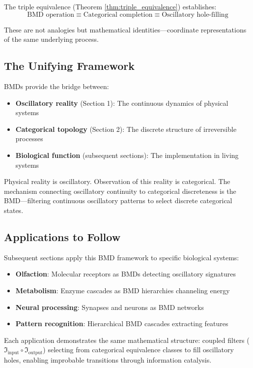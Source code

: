 \documentclass[12pt,a4paper]{article}
\begin{document}
The triple equivalence (Theorem \ref{thm:triple_equivalence}) establishes:
\begin{equation}
\text{BMD operation} \equiv \text{Categorical completion} \equiv \text{Oscillatory hole-filling}
\end{equation}

These are not analogies but mathematical identities—coordinate representations of the same underlying process.

\subsection{The Unifying Framework}

BMDs provide the bridge between:
\begin{itemize}
\item \textbf{Oscillatory reality} (Section 1): The continuous dynamics of physical systems
\item \textbf{Categorical topology} (Section 2): The discrete structure of irreversible processes
\item \textbf{Biological function} (subsequent sections): The implementation in living systems
\end{itemize}

Physical reality is oscillatory. Observation of this reality is categorical. The mechanism connecting oscillatory continuity to categorical discreteness is the BMD—filtering continuous oscillatory patterns to select discrete categorical states.

\subsection{Applications to Follow}

Subsequent sections apply this BMD framework to specific biological systems:

\begin{itemize}
\item \textbf{Olfaction}: Molecular receptors as BMDs detecting oscillatory signatures
\item \textbf{Metabolism}: Enzyme cascades as BMD hierarchies channeling energy
\item \textbf{Neural processing}: Synapses and neurons as BMD networks
\item \textbf{Pattern recognition}: Hierarchical BMD cascades extracting features
\end{itemize}

Each application demonstrates the same mathematical structure: coupled filters ($\Im_{\text{input}} \circ \Im_{\text{output}}$) selecting from categorical equivalence classes to fill oscillatory holes, enabling improbable transitions through information catalysis.
\end{document}
